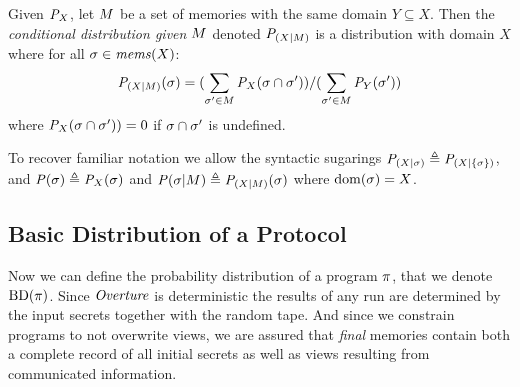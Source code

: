 \begin{definition}
  Given ${\mathit{P}}_{X}$, let $M$ be a set of memories with the
  same domain $Y \subseteq X$. Then the \emph{conditional distribution given
  $M$}  denoted
  $\mathit{P}_{({X}|{M})}$ is a distribution with domain $X$ where for all
  $\sigma \in \mathit{mems}(X)$:
  $$
  \mathit{P}_{({X}|{M})}(\sigma) =
  (\sum_{\sigma' \in M} {\mathit{P}}_{X}(\sigma \cap \sigma')) /
  (\sum_{\sigma' \in M} {\mathit{P}}_{Y}(\sigma'))
  $$
  where ${\mathit{P}}_{X}(\sigma \cap \sigma')) = 0$ if $\sigma \cap \sigma'$ is undefined.
\end{definition}
To recover familiar notation we allow the syntactic
sugarings $\mathit{P}_{({X}|{\sigma})}  \triangleq \mathit{P}_{({X}|{\{ \sigma\}})}$, and
$\mathit{P}(\sigma)  \triangleq {\mathit{P}}_{X}(\sigma)$ and $\mathit{P}(\sigma|M) \triangleq
\mathit{P}_{({X}|{M})}(\sigma)$ where $\mathrm{dom}(\sigma) = X$.

\subsection{Basic Distribution of a Protocol}
Now we can define the probability distribution of a program $\pi$,
that we denote $\mathrm{BD}(\pi)$. Since $\mathit{Overture}$ is deterministic the
results of any run are determined by the input secrets together with
the random tape. And since we constrain programs to not overwrite
views, we are assured that \emph{final} memories contain both a
complete record of all initial secrets as well as views resulting from
communicated information. 

